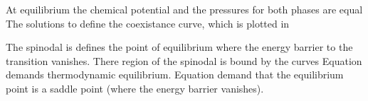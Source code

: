 At equilibrium the chemical potential and the pressures for both phases are equal
The solutions to  define the coexistance curve,
which is plotted in 

The spinodal is defines the point of equilibrium where the energy barrier to the transition vanishes.
There region of the spinodal is bound by the curves
Equation   demands thermodynamic equilibrium.
Equation      demand that the equilibrium point is a saddle point (where the energy barrier vanishes).





